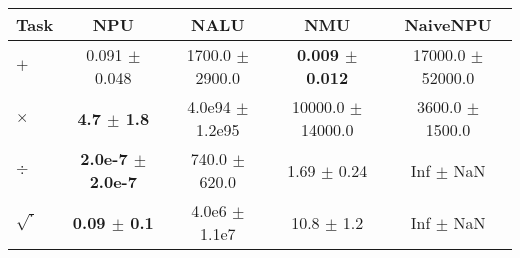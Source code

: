 \begin{tabular}{lcccc}
\toprule
Task & NPU & NALU & NMU & NaiveNPU\\
\midrule
$+$  & 0.091 $\pm$ 0.048 & 1700.0 $\pm$ 2900.0 & \textbf{0.009 $\pm$ 0.012} & 17000.0 $\pm$ 52000.0 \\
$\times$ & \textbf{4.7 $\pm$ 1.8} & 4.0e94 $\pm$ 1.2e95 & 10000.0 $\pm$ 14000.0 & 3600.0 $\pm$ 1500.0 \\
$\div$  & \textbf{2.0e-7 $\pm$ 2.0e-7} & 740.0 $\pm$ 620.0 & 1.69 $\pm$ 0.24 & Inf $\pm$ NaN \\
$\sqrt{\cdot}$ & \textbf{0.09 $\pm$ 0.1} & 4.0e6 $\pm$ 1.1e7 & 10.8 $\pm$ 1.2 & Inf $\pm$ NaN \\
\bottomrule
\end{tabular}
